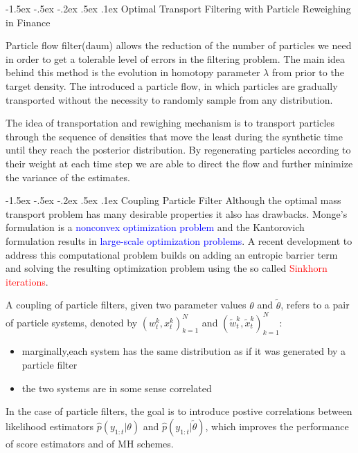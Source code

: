 \documentclass[a4paper, 11pt]{article}
\makeatletter
\newcommand{\sihao}{\fontsize{14pt}{\baselineskip}\selectfont}
\renewcommand\section{\@startsection{section}{1}{\z@}%
{-1.5ex \@plus -.5ex \@minus -.2ex}%
{.5ex \@plus .1ex}%
{\normalfont\sihao\CJKfamily{hei}}}
\makeatother
\begin{document}
\begin{CJK}{UTF8}{gbsn}
\section{Optimal Transport Filtering with Particle Reweighing in Finance}

Particle flow filter(daum) allows the reduction of the number of particles we need in order to get a tolerable level of errors in the filtering problem. The main idea behind this method is the evolution in homotopy parameter $\lambda$ from prior to the target density. The introduced a particle flow, in which particles are gradually transported without the necessity to randomly sample from any distribution.

The idea of transportation and rewighing mechanism is to transport particles through the sequence of densities that move the least during the synthetic time until they reach the posterior distribution. By regenerating particles according  to their weight at each time step we are able to direct the flow and further minimize the variance of the estimates.

\section{Coupling Particle Filter}
Although the optimal mass transport problem has many desirable properties it
also has drawbacks. Monge’s formulation is a \textcolor{blue}{nonconvex optimization problem} and
the Kantorovich formulation results in \textcolor{blue}{large-scale optimization problems}.
A recent development to address this computational problem builds on adding
an entropic barrier term and solving the resulting optimization problem using the
so called \textcolor{red}{Sinkhorn iterations}.


A coupling of particle filters, given two parameter values $\theta$ and $\tilde{\theta}$, refers to a pair of particle systems, denoted by $(w_t^k,x_t^k)_{k=1}^N$ and $(\tilde{w}_t^k,\tilde{x}_t^k)_{k=1}^N$:
\begin{itemize}
\item marginally,each system has the same distribution as if it was generated by a particle filter
\item the two systems are in some sense correlated
\end{itemize}
In the case of particle filters, the goal is to introduce postive correlations between likelihood estimators $\hat{p}(y_{1:t}|\theta)$ and $\hat{p}(y_{1:t}|\tilde{\theta})$, which improves the performance of score estimators and of MH schemes.


\end{CJK}
\end{document}
